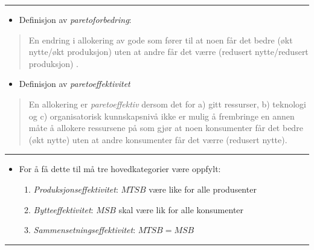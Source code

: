 \documentclass[
  letterpaper,
  DIV=11,
  numbers=noendperiod]{scrartcl}
\providecommand{\tightlist}{%
  \setlength{\itemsep}{0pt}\setlength{\parskip}{0pt}}\usepackage{longtable,booktabs,array}
\begin{document}
\begin{center}\rule{0.5\linewidth}{0.5pt}\end{center}

\begin{itemize}
\tightlist
\item
  Definisjon av \emph{paretoforbedring}:
\end{itemize}

\begin{quote}
En endring i allokering av gode som fører til at noen får det bedre (økt
nytte/økt produksjon) uten at andre får det værre (redusert
nytte/redusert produksjon) .
\end{quote}

\begin{itemize}
\tightlist
\item
  Definisjon av \emph{paretoeffektivitet}
\end{itemize}

\begin{quote}
En allokering er \emph{paretoeffektiv} dersom det for a) gitt ressurser,
b) teknologi og c) organisatorisk kunnskapsnivå ikke er mulig å
frembringe en annen måte å allokere ressursene på som gjør at noen
konsumenter får det bedre (økt nytte) uten at andre konsumenter får det
værre (redusert nytte).
\end{quote}

\begin{center}\rule{0.5\linewidth}{0.5pt}\end{center}

\begin{itemize}
\tightlist
\item
  For å få dette til må tre hovedkategorier være oppfylt:

  \begin{enumerate}
  \def\labelenumi{\arabic{enumi}.}
  \tightlist
  \item
    \emph{Produksjonseffektivitet}: \(MTSB\) være like for alle
    produsenter
  \item
    \emph{Bytteeffektivitet}: \(MSB\) skal være lik for alle konsumenter
  \item
    \emph{Sammensetningseffektivitet}: \(MTSB=MSB\)
  \end{enumerate}
\end{itemize}

\begin{center}\rule{0.5\linewidth}{0.5pt}\end{center}
\end{document}

